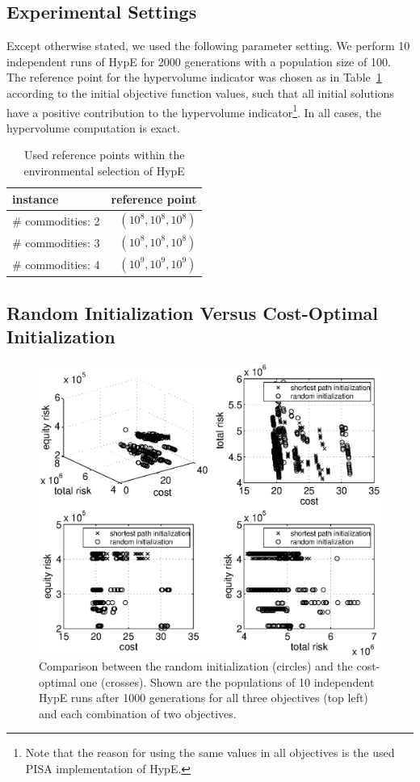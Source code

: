 \documentclass[preprint,12pt]{elsarticle}
\begin{document}
\subsection{Experimental Settings}
Except otherwise stated, we used the following parameter setting. We perform 10 independent runs of HypE for 2000 generations with a population size of 100. The reference point for the hypervolume indicator was chosen as in Table~\ref{tab:referencepoints} according to the initial objective function values, such that all initial solutions have a positive contribution to the hypervolume indicator\footnote{Note that the reason for using the same values in all objectives is the used PISA implementation of HypE.}. In all cases, the hypervolume computation is exact.

\begin{table}
\centering
\caption{\label{tab:referencepoints} Used reference points within the environmental selection of HypE}
\begin{tabular}{lr}
	\toprule
	instance & reference point\\ \midrule
	\# commodities: 2 & $(10^8, 10^8, 10^8)$\\
	\# commodities: 3 & $(10^8, 10^8, 10^8)$\\
	\# commodities: 4 & $(10^9, 10^9, 10^9)$\\
	\bottomrule
\end{tabular}
\end{table}


\subsection{Random Initialization Versus Cost-Optimal Initialization}

\begin{figure}%
	\includegraphics[width=\columnwidth]{../experiments/randVsCost/allsolutions.eps}%
	\caption{\label{fig:allsolutions} Comparison between the random initialization (circles) and the cost-optimal one (crosses). Shown are the populations of 10 independent HypE runs after 1000 generations for all three objectives (top left) and each combination of two objectives.}
\end{figure}
\end{document}
